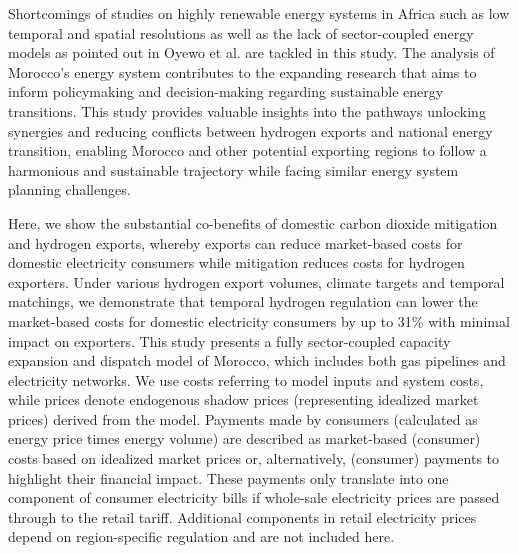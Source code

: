 \documentclass[5p,numafflabel]{elsarticle}
\begin{document}
Shortcomings of studies on highly renewable energy systems in Africa such as low temporal and spatial resolutions as well as the lack of sector-coupled energy models as pointed out in Oyewo et al.\cite{Oyewo2023} are tackled in this study. The analysis of Morocco's energy system contributes to the expanding research that aims to inform policymaking and decision-making regarding sustainable energy transitions. This study provides valuable insights into the pathways unlocking synergies and reducing conflicts between hydrogen exports and national energy transition, enabling Morocco and other potential exporting regions to follow a harmonious and sustainable trajectory while facing similar energy system planning challenges.







Here, we show the substantial co-benefits of domestic carbon dioxide mitigation and hydrogen exports, whereby exports can reduce market-based costs for domestic electricity consumers while mitigation reduces costs for hydrogen exporters.
Under various hydrogen export volumes, climate targets and temporal matchings, we demonstrate 
that temporal hydrogen regulation can lower the market-based costs for domestic electricity consumers by up to 31\% with minimal impact on exporters.
This study presents a fully sector-coupled capacity expansion and dispatch model of Morocco, which includes both gas pipelines and electricity networks. 
We use costs referring to model inputs and system costs, while prices denote endogenous shadow prices (representing idealized market prices) derived from the model. Payments made by consumers (calculated as energy price times energy volume) are described as market-based (consumer) costs based on idealized market prices or, alternatively, (consumer) payments to highlight their financial impact. 
These payments only translate into one component of consumer electricity bills if whole-sale electricity prices are passed through to the retail tariff. Additional components in retail electricity prices depend on region-specific regulation and are not included here.
\end{document}
